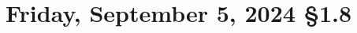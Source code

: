 \documentclass[12pt]{amsart}
\def\Fr{Friday}
\newcommand{\R}{{\mathbb{R}}}
\newcommand{\N}{\mathbb{N}}
\numberwithin{equation}{section}
\theoremstyle{plain} %
\newtheorem{obs}[equation]{Observation}
\newtheorem*{question}{Question}
\newtheorem*{axiom*}{Axiom}
\newcommand{\Sept}[3]{\section{#2, September #1, 2024 \quad \S#3}}
\theoremstyle{definition}
\newtheorem{ex}[equation]{Example}
\theoremstyle{remark}
\begin{document}
%
%
%



%
%
%






\newpage

\Sept{5}{\Fr}{1.8}

	
\end{document}
